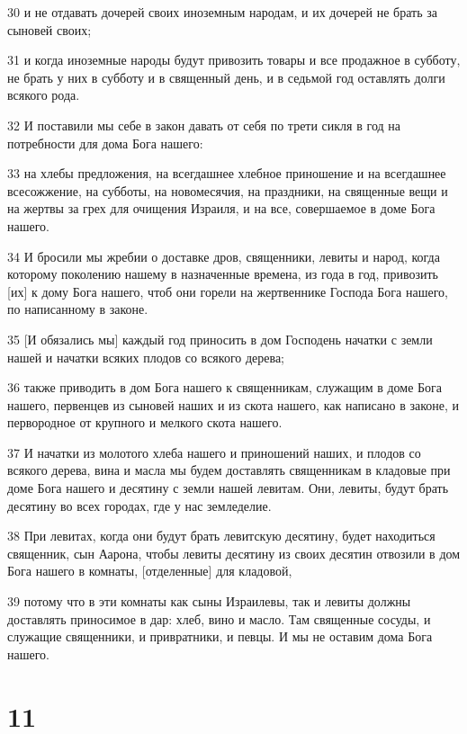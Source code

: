 \par 30 и не отдавать дочерей своих иноземным народам, и их дочерей не брать за сыновей своих;
\par 31 и когда иноземные народы будут привозить товары и все продажное в субботу, не брать у них в субботу и в священный день, и в седьмой год оставлять долги всякого рода.
\par 32 И поставили мы себе в закон давать от себя по трети сикля в год на потребности для дома Бога нашего:
\par 33 на хлебы предложения, на всегдашнее хлебное приношение и на всегдашнее всесожжение, на субботы, на новомесячия, на праздники, на священные вещи и на жертвы за грех для очищения Израиля, и на все, совершаемое в доме Бога нашего.
\par 34 И бросили мы жребии о доставке дров, священники, левиты и народ, когда которому поколению нашему в назначенные времена, из года в год, привозить [их] к дому Бога нашего, чтоб они горели на жертвеннике Господа Бога нашего, по написанному в законе.
\par 35 [И обязались мы] каждый год приносить в дом Господень начатки с земли нашей и начатки всяких плодов со всякого дерева;
\par 36 также приводить в дом Бога нашего к священникам, служащим в доме Бога нашего, первенцев из сыновей наших и из скота нашего, как написано в законе, и первородное от крупного и мелкого скота нашего.
\par 37 И начатки из молотого хлеба нашего и приношений наших, и плодов со всякого дерева, вина и масла мы будем доставлять священникам в кладовые при доме Бога нашего и десятину с земли нашей левитам. Они, левиты, будут брать десятину во всех городах, где у нас земледелие.
\par 38 При левитах, когда они будут брать левитскую десятину, будет находиться священник, сын Аарона, чтобы левиты десятину из своих десятин отвозили в дом Бога нашего в комнаты, [отделенные] для кладовой,
\par 39 потому что в эти комнаты как сыны Израилевы, так и левиты должны доставлять приносимое в дар: хлеб, вино и масло. Там священные сосуды, и служащие священники, и привратники, и певцы. И мы не оставим дома Бога нашего.

\chapter{11}

